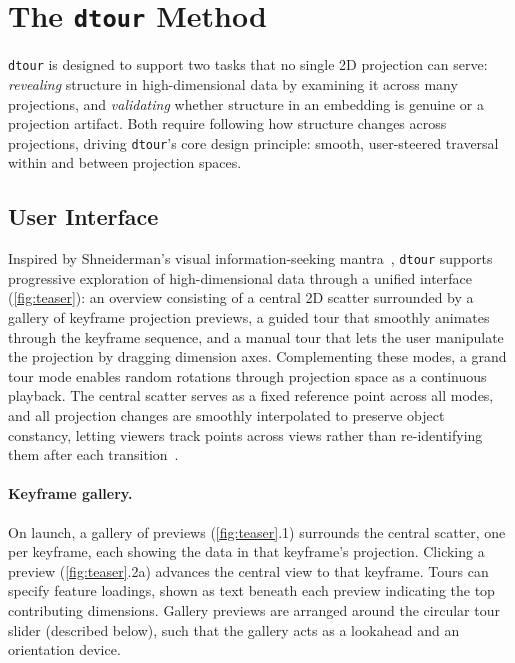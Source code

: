 \documentclass{vgtc}
\newcommand{\dtour}{\texorpdfstring{\texttt{dtour}\xspace}{dtour}}
\begin{document}
\section{The \dtour{} Method}
\label{sec:dtour}

\dtour{} is designed to support two tasks that no single 2D projection can serve: \emph{revealing} structure in high-dimensional data by examining it across many projections, and \emph{validating} whether structure in an embedding is genuine or a projection artifact. Both require following how structure changes across projections, driving \dtour{}'s core design principle: smooth, user-steered traversal within and between projection spaces.

\subsection{User Interface}
\label{sec:user-interface}

Inspired by Shneiderman's visual information-seeking mantra~\cite{shneiderman2003eyes}, \dtour{} supports progressive exploration of high-dimensional data through a unified interface (\autoref{fig:teaser}): an overview consisting of a central 2D scatter surrounded by a gallery of keyframe projection previews, a guided tour that smoothly animates through the keyframe sequence, and a manual tour that lets the user manipulate the projection by dragging dimension axes. Complementing these modes, a grand tour mode enables random rotations through projection space as a continuous playback. The central scatter serves as a fixed reference point across all modes, and all projection changes are smoothly interpolated to preserve object constancy, letting viewers track points across views rather than re-identifying them after each transition~\cite{robertson1993information,rodrigues2024comparative}.

\paragraph{Keyframe gallery.}
On launch, a gallery of previews (\autoref{fig:teaser}.1) surrounds the central scatter, one per keyframe, each showing the data in that keyframe's projection. Clicking a preview (\autoref{fig:teaser}.2a) advances the central view to that keyframe. Tours can specify feature loadings, shown as text beneath each preview indicating the top contributing dimensions. Gallery previews are arranged around the circular tour slider (described below), such that the gallery acts as a lookahead and an orientation device.
\end{document}
